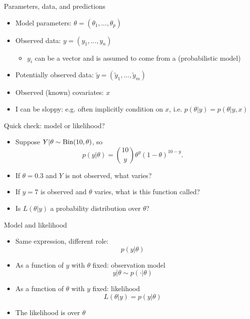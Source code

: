 \documentclass[10pt]{beamer}
\begin{document}
\begin{frame}{Parameters, data, and predictions}

  \begin{itemize}
  \item Model parameters: $\theta = (\theta_1,...,\theta_p)$
  \item Observed data: $y = (y_1,...,y_n)$
    \begin{itemize}
    \item $y_i$ can be a vector and is assumed to come from a  (probabilistic model)
    \end{itemize}
  \item Potentially observed data: $\tilde{y} = (\tilde{y}_1,...,\tilde{y}_m)$
  \item Observed (known) covariates: $x$
  \pause
  \item I can be sloppy: e.g. often implicitly condition on $x$, i.e. $p(\theta|y) = p(\theta|y, x)$
  \end{itemize}
\end{frame}


\begin{frame}{Quick check: model or likelihood?}

  \begin{itemize}
  \item Suppose $Y|\theta \sim \operatorname{Bin}(10,\theta)$, so
  \[
  p(y|\theta) = {10 \choose y}\theta^y(1-\theta)^{10-y}.
  \]
  \pause
  \item If $\theta=0.3$ and $Y$ is not observed, what varies?
  \pause
  \item If $y=7$ is observed and $\theta$ varies, what is this function called?
  \pause
  \item Is $L(\theta|y)$ a probability distribution over $\theta$?
  \end{itemize}

\end{frame}


\begin{frame}{Model and likelihood}

  \begin{itemize}
  \item Same expression, different role:
  \[
    p(y|\theta)
  \]
  \pause
  \item As a function of $y$ with $\theta$ fixed: observation model
  \[
    y|\theta \sim p(\cdot|\theta)
  \]
  \pause
  \item As a function of $\theta$ with $y$ fixed: likelihood
  \[
    L(\theta|y) = p(y|\theta)
  \]
  \pause
  \item The likelihood is  over $\theta$
  \end{itemize}
\end{frame}
\end{document}
